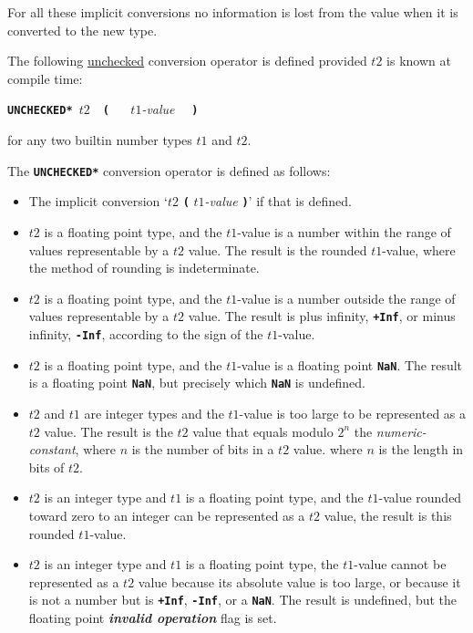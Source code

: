 \documentclass[12pt]{article}
\newcommand{\TT}[1]{{\tt \bfseries #1}}
\newcommand{\key}[1]{{\bf \em #1}\index{#1}}
\begin{document}
For all these implicit conversions no information is lost from
the value when it is converted to the new type.

The following \underline{unchecked}
conversion operator is defined provided $t2$ is known at compile time:
\begin{center}

\TT{*UNCHECKED*~}$t2$~~\TT{(} ~~ $t1${\em -value} ~~\TT{)}%
\label{<<**}

for any two builtin number types $t1$ and $t2$.

\end{center}

The \TT{*UNCHECKED*} conversion operator is defined as follows:
\begin{itemize}
\item The implicit conversion `$t2$ \TT{(} $t1${\em -value} \TT{)}'
if that is defined.
\item $t2$ is a floating point type,
and the $t1$-value is a number within the range of values representable
by a $t2$ value.
The result is the rounded $t1$-value,
where the method of rounding is indeterminate.
\item $t2$ is a floating point type,
and the $t1$-value is a number outside the range of values representable
by a $t2$ value.
The result is plus infinity, \TT{+Inf}, or minus infinity, \TT{-Inf},
according to the sign of the $t1$-value.
\item $t2$ is a floating point type,
and the $t1$-value is a floating point \TT{NaN}.
The result is a floating point \TT{NaN}, but precisely which \TT{NaN}
is undefined.
\item $t2$ and $t1$ are integer types and the $t1$-value is too large
to be represented as a $t2$ value.
The result is the $t2$ value that
equals modulo $2^n$ the {\em numeric-constant}, where $n$ is the
number of bits in a $t2$ value.
where $n$ is the length in bits of $t2$.
\item $t2$ is an integer type and $t1$ is a floating point type, and
the $t1$-value rounded toward zero to an integer
can be represented as a $t2$ value,
the result is this rounded $t1$-value.
\item $t2$ is an integer type and $t1$ is a floating point type,
the $t1$-value cannot be represented as a $t2$ value because its
absolute value is too large, or because it is not a number but is
\TT{+Inf}, \TT{-Inf}, or a \TT{NaN}.  The result is undefined, but
the floating point \key{invalid operation} flag is set.
\end{itemize}
\end{document}
